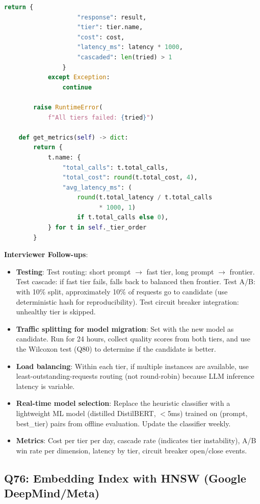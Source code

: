 \begin{lstlisting}[language=Python]
                return {
                    "response": result,
                    "tier": tier.name,
                    "cost": cost,
                    "latency_ms": latency * 1000,
                    "cascaded": len(tried) > 1
                }
            except Exception:
                continue

        raise RuntimeError(
            f"All tiers failed: {tried}")

    def get_metrics(self) -> dict:
        return {
            t.name: {
                "total_calls": t.total_calls,
                "total_cost": round(t.total_cost, 4),
                "avg_latency_ms": (
                    round(t.total_latency / t.total_calls
                          * 1000, 1)
                    if t.total_calls else 0),
            } for t in self._tier_order
        }
\end{lstlisting}

\textbf{Interviewer Follow-ups}:
\begin{itemize}[leftmargin=*]
    \item \textbf{Testing}: Test routing: short prompt $\to$ fast tier, long prompt $\to$ frontier. Test cascade: if fast tier fails, falls back to balanced then frontier. Test A/B: with 10\% split, approximately 10\% of requests go to candidate (use deterministic hash for reproducibility). Test circuit breaker integration: unhealthy tier is skipped.
    \item \textbf{Traffic splitting for model migration}: Set  with the new model as candidate. Run for 24 hours, collect quality scores from both tiers, and use the Wilcoxon test (Q80) to determine if the candidate is better.
    \item \textbf{Load balancing}: Within each tier, if multiple instances are available, use least-outstanding-requests routing (not round-robin) because LLM inference latency is variable.
    \item \textbf{Real-time model selection}: Replace the heuristic classifier with a lightweight ML model (distilled DistilBERT, $<$5ms) trained on (prompt, best\_tier) pairs from offline evaluation. Update the classifier weekly.
    \item \textbf{Metrics}: Cost per tier per day, cascade rate (indicates tier instability), A/B win rate per dimension, latency by tier, circuit breaker open/close events.
\end{itemize}

\subsection{Q76: Embedding Index with HNSW (Google DeepMind/Meta)}

